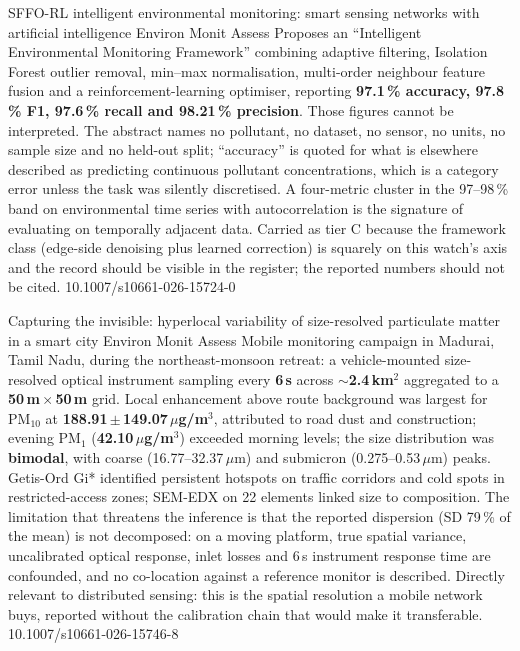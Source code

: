 \documentclass[10pt]{article}
\begin{document}
{SFFO-RL intelligent environmental monitoring: smart sensing networks with artificial
intelligence}
{Environ Monit Assess}
{Proposes an ``Intelligent Environmental Monitoring Framework'' combining adaptive
filtering, Isolation Forest outlier removal, min--max normalisation, multi-order neighbour
feature fusion and a reinforcement-learning optimiser, reporting \textbf{97.1\,\%
accuracy, 97.8\,\% F1, 97.6\,\% recall and 98.21\,\% precision}. Those figures cannot be
interpreted. The abstract names no pollutant, no dataset, no sensor, no units, no sample
size and no held-out split; ``accuracy'' is quoted for what is elsewhere described as
predicting continuous pollutant concentrations, which is a category error unless the task
was silently discretised. A four-metric cluster in the 97--98\,\% band on environmental
time series with autocorrelation is the signature of evaluating on temporally adjacent
data. Carried as tier C because the framework class (edge-side denoising plus
learned correction) is squarely on this watch's axis and the record should be visible
in the register; the reported numbers should not be cited.}
{10.1007/s10661-026-15724-0}

{Capturing the invisible: hyperlocal variability of size-resolved particulate matter in a
smart city}
{Environ Monit Assess}
{Mobile monitoring campaign in Madurai, Tamil Nadu, during the northeast-monsoon retreat:
a vehicle-mounted size-resolved optical instrument sampling every \textbf{6\,s} across
$\sim$\textbf{2.4\,km$^2$} aggregated to a \textbf{50\,m\,$\times$\,50\,m} grid.
Local enhancement above route background was largest for PM$_{10}$ at
\textbf{188.91\,$\pm$\,149.07\,$\mu$g/m$^3$}, attributed to road dust and construction;
evening PM$_{1}$ (\textbf{42.10\,$\mu$g/m$^3$}) exceeded morning levels; the size
distribution was \textbf{bimodal}, with coarse (16.77--32.37\,$\mu$m) and submicron
(0.275--0.53\,$\mu$m) peaks. Getis-Ord Gi* identified persistent hotspots on traffic
corridors and cold spots in restricted-access zones; SEM-EDX on 22 elements linked size to
composition. The limitation that threatens the inference is that the reported dispersion
(SD 79\,\% of the mean) is not decomposed: on a moving platform, true spatial variance,
uncalibrated optical response, inlet losses and 6\,s instrument response time are
confounded, and no co-location against a reference monitor is described. Directly relevant
to distributed sensing: this is the spatial resolution a mobile network buys, reported
without the calibration chain that would make it transferable.}
{10.1007/s10661-026-15746-8}
\end{document}
